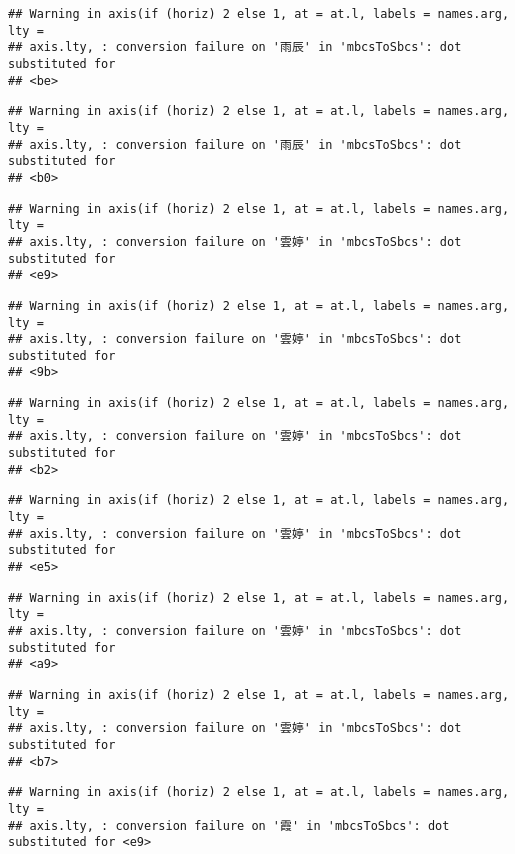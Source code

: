 \documentclass[
]{article}
\begin{document}
\begin{verbatim}
## Warning in axis(if (horiz) 2 else 1, at = at.l, labels = names.arg, lty =
## axis.lty, : conversion failure on '雨辰' in 'mbcsToSbcs': dot substituted for
## <be>
\end{verbatim}

\begin{verbatim}
## Warning in axis(if (horiz) 2 else 1, at = at.l, labels = names.arg, lty =
## axis.lty, : conversion failure on '雨辰' in 'mbcsToSbcs': dot substituted for
## <b0>
\end{verbatim}

\begin{verbatim}
## Warning in axis(if (horiz) 2 else 1, at = at.l, labels = names.arg, lty =
## axis.lty, : conversion failure on '雲婷' in 'mbcsToSbcs': dot substituted for
## <e9>
\end{verbatim}

\begin{verbatim}
## Warning in axis(if (horiz) 2 else 1, at = at.l, labels = names.arg, lty =
## axis.lty, : conversion failure on '雲婷' in 'mbcsToSbcs': dot substituted for
## <9b>
\end{verbatim}

\begin{verbatim}
## Warning in axis(if (horiz) 2 else 1, at = at.l, labels = names.arg, lty =
## axis.lty, : conversion failure on '雲婷' in 'mbcsToSbcs': dot substituted for
## <b2>
\end{verbatim}

\begin{verbatim}
## Warning in axis(if (horiz) 2 else 1, at = at.l, labels = names.arg, lty =
## axis.lty, : conversion failure on '雲婷' in 'mbcsToSbcs': dot substituted for
## <e5>
\end{verbatim}

\begin{verbatim}
## Warning in axis(if (horiz) 2 else 1, at = at.l, labels = names.arg, lty =
## axis.lty, : conversion failure on '雲婷' in 'mbcsToSbcs': dot substituted for
## <a9>
\end{verbatim}

\begin{verbatim}
## Warning in axis(if (horiz) 2 else 1, at = at.l, labels = names.arg, lty =
## axis.lty, : conversion failure on '雲婷' in 'mbcsToSbcs': dot substituted for
## <b7>
\end{verbatim}

\begin{verbatim}
## Warning in axis(if (horiz) 2 else 1, at = at.l, labels = names.arg, lty =
## axis.lty, : conversion failure on '霞' in 'mbcsToSbcs': dot substituted for <e9>
\end{verbatim}
\end{document}
